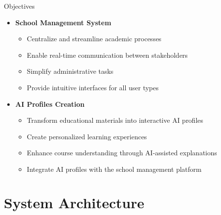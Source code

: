 \documentclass[aspectratio=169]{beamer}
\begin{document}
\begin{frame}{Objectives}
    \begin{itemize}
        \item \textbf{School Management System}
        \begin{itemize}
            \item Centralize and streamline academic processes
            \item Enable real-time communication between stakeholders
            \item Simplify administrative tasks
            \item Provide intuitive interfaces for all user types
        \end{itemize}
        \vspace{0.5cm}
        \item \textbf{AI Profiles Creation}
        \begin{itemize}
            \item Transform educational materials into interactive AI profiles
            \item Create personalized learning experiences
            \item Enhance course understanding through AI-assisted explanations
            \item Integrate AI profiles with the school management platform
        \end{itemize}
    \end{itemize}
\end{frame}

\section{System Architecture}
\end{document}
